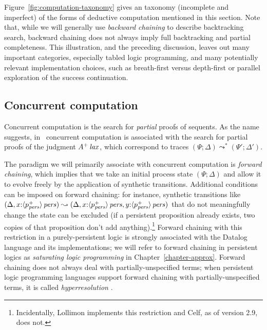 Figure~\ref{fig:computation-taxonomy} gives an taxonomy (incomplete
and imperfect) of the forms of deductive computation mentioned in this
section. Note that, while we will generally use {\it backward
  chaining} to describe backtracking search, backward chaining does
not always imply full backtracking and partial completeness. This
illustration, and the preceding discussion, leaves out many important
categories, especially tabled logic programming, and many potentially
relevant implementation choices, such as breath-first versus
depth-first or parallel exploration of the success continuation.


\subsection{Concurrent computation}
\label{sec:framework-logicprog-trace}


Concurrent computation is the search for {\it partial} proofs of
sequents. As the name suggests, in \sls~concurrent computation is
associated with the search for partial proofs of the judgment
${A^+}\,{{\it lax}}$, which correspond to traces $(\Psi;
\Delta) \leadsto^* (\Psi'; \Delta')$. 

The paradigm we will primarily associate with concurrent computation
is {\it forward chaining}, which implies that we take an initial
process state $(\Psi;\Delta)$ and allow it to evolve freely by the
application of synthetic transitions. Additional conditions can be
imposed on forward chaining: for instance, synthetic transitions like
$(\Delta, x{:}{\langle {p^+_{\it pers}} \rangle}\,{{\it pers}}) \leadsto (\Delta,
x{:}{\langle {p^+_{\it pers}} \rangle}\,{{\it pers}}, y{:}{\langle {p^+_{\it pers}} \rangle}\,{{\it pers}})$ that
do not meaningfully change the state can be excluded (if a persistent
proposition already exists, two copies of that proposition don't add
anything).\footnote{Incidentally, Lollimon implements this restriction
  and Celf, as of version 2.9, does not.} 
Forward chaining with this restriction in a
purely-persistent logic is strongly associated with the Datalog
language and its implementations; we will refer to forward chaining in
persistent logics as {\it saturating logic programming} in 
Chapter~\ref{chapter-approx}.
Forward chaining does not always deal with partially-unspecified
terms; when persistent logic programming languages support forward
chaining with partially-unspecified terms, it is called {\it
  hyperresolution} \cite{fermuller01resolution}.

